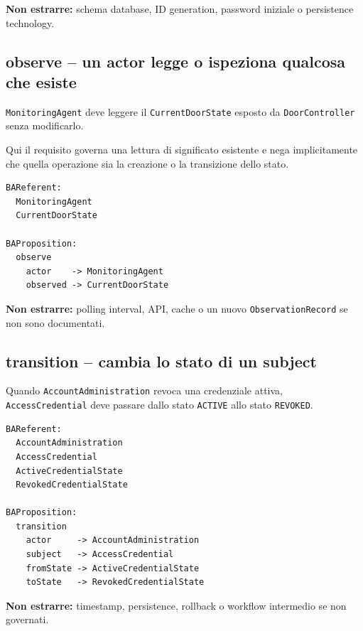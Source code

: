 \documentclass[11pt,a4paper]{article}
\newcommand{\code}[1]{\nolinkurl{#1}}
\begin{document}
\textbf{Non estrarre:} schema database, ID generation, password iniziale o persistence technology.

\subsection{observe -- un actor legge o ispeziona qualcosa che esiste}

\begin{examplebox}
\code{MonitoringAgent} deve leggere il \code{CurrentDoorState} esposto da \code{DoorController} senza modificarlo.
\end{examplebox}

Qui il requisito governa una lettura di significato esistente e nega implicitamente che quella operazione sia la creazione o la transizione dello stato.

\begin{lstlisting}
BAReferent:
  MonitoringAgent
  CurrentDoorState

BAProposition:
  observe
    actor    -> MonitoringAgent
    observed -> CurrentDoorState
\end{lstlisting}

\textbf{Non estrarre:} polling interval, API, cache o un nuovo \code{ObservationRecord} se non sono documentati.

\subsection{transition -- cambia lo stato di un subject}

\begin{examplebox}
Quando \code{AccountAdministration} revoca una credenziale attiva, \code{AccessCredential} deve passare dallo stato \code{ACTIVE} allo stato \code{REVOKED}.
\end{examplebox}

\begin{lstlisting}
BAReferent:
  AccountAdministration
  AccessCredential
  ActiveCredentialState
  RevokedCredentialState

BAProposition:
  transition
    actor     -> AccountAdministration
    subject   -> AccessCredential
    fromState -> ActiveCredentialState
    toState   -> RevokedCredentialState
\end{lstlisting}

\textbf{Non estrarre:} timestamp, persistence, rollback o workflow intermedio se non governati.
\end{document}
